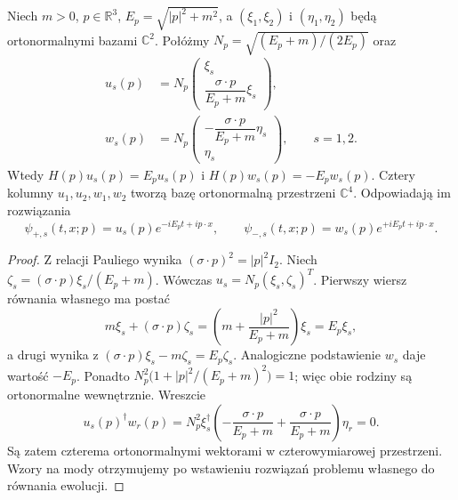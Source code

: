 \begin{stwierdzenie}
\label{prop:dirac-fale-plaskie}
Niech $m>0$, $p\in\mathbb R^3$,
$E_p=\sqrt{|p|^2+m^2}$, a
$(\xi_1,\xi_2)$ i $(\eta_1,\eta_2)$ będą
ortonormalnymi bazami $\mathbb C^2$.
Połóżmy $N_p=\sqrt{(E_p+m)/(2E_p)}$ oraz
\begin{equation}\label{eq:dirac-u-w}
 \begin{aligned}
 u_s(p)&=N_p\begin{pmatrix}
 \xi_s\\ \dfrac{\sigma\cdot p}{E_p+m}\xi_s
 \end{pmatrix},\\[4pt]
 w_s(p)&=N_p\begin{pmatrix}
 -\dfrac{\sigma\cdot p}{E_p+m}\eta_s\\ \eta_s
 \end{pmatrix},\qquad s=1,2.
 \end{aligned}
\end{equation}
Wtedy $H(p)u_s(p)=E_pu_s(p)$ i
$H(p)w_s(p)=-E_pw_s(p)$. Cztery kolumny
$u_1,u_2,w_1,w_2$ tworzą bazę ortonormalną
przestrzeni $\mathbb C^4$.
Odpowiadają im rozwiązania
\begin{equation}\label{eq:dirac-cztery-mody}
 \psi_{+,s}(t,x;p)=u_s(p)e^{-iE_pt+ip\cdot x},\qquad
 \psi_{-,s}(t,x;p)=w_s(p)e^{+iE_pt+ip\cdot x}.
\end{equation}
\end{stwierdzenie}
\begin{proof}
Z relacji Pauliego wynika
$(\sigma\cdot p)^2=|p|^2I_2$.
Niech $\zeta_s=(\sigma\cdot p)\xi_s/(E_p+m)$.
Wówczas $u_s=N_p(\xi_s,\zeta_s)^T$.
Pierwszy wiersz równania własnego ma postać
\[
 m\xi_s+(\sigma\cdot p)\zeta_s
 =\left(m+\frac{|p|^2}{E_p+m}\right)\xi_s
 =E_p\xi_s,
\]
a drugi wynika z
$(\sigma\cdot p)\xi_s-m\zeta_s=E_p\zeta_s$.
Analogiczne podstawienie $w_s$ daje wartość $-E_p$.
Ponadto
$N_p^2\bigl(1+|p|^2/(E_p+m)^2\bigr)=1$;
więc obie rodziny są ortonormalne wewnętrznie.
Wreszcie
\[
 u_s(p)^\dagger w_r(p)
 =N_p^2\xi_s^\dagger
 \left(-\frac{\sigma\cdot p}{E_p+m}
       +\frac{\sigma\cdot p}{E_p+m}\right)\eta_r=0.
\]
Są zatem czterema ortonormalnymi wektorami
w czterowymiarowej przestrzeni. Wzory na mody
otrzymujemy po wstawieniu rozwiązań problemu własnego
do równania ewolucji.
\end{proof}

